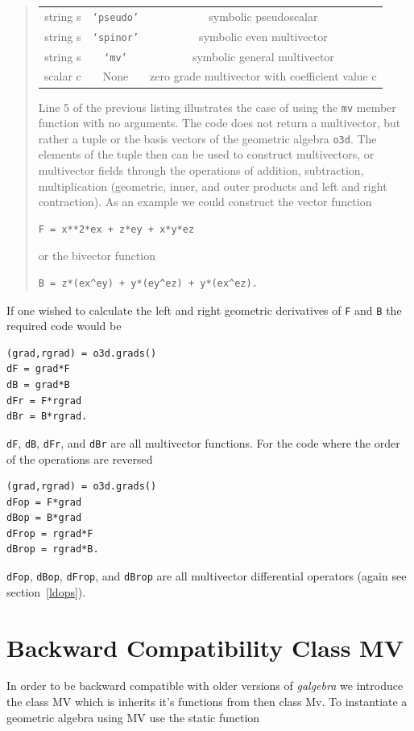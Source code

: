 \documentclass[12pt]{report}
\newcommand{\T}[1]{\texttt{#1}}
\begin{document}
\begin{quote}
\begin{center}
\begin{longtable}{ccc}
         string s &  \T{`pseudo'} & symbolic pseudoscalar \\
         string s &  \T{`spinor'} & symbolic even multivector \\ 
         string s &  \T{`mv'} & symbolic general multivector \\
         scalar c & None  &  zero grade multivector with coefficient value c 
	\end{longtable}
\end{center}
Line 5 of the previous listing illustrates the case of using the \T{mv} member function with
no arguments. The code does not return a multivector, but rather a tuple or the basis vectors of the geometric algebra \T{o3d}.  
The elements of the tuple then can
be used to construct multivectors, or multivector fields through the operations
of addition, subtraction, multiplication (geometric, inner, and outer products and left and right contraction).
As an example we could construct the vector function
\begin{lstlisting}[numbers=none]
F = x**2*ex + z*ey + x*y*ez
\end{lstlisting}	
or the bivector function
\begin{lstlisting}[numbers=none]
B = z*(ex^ey) + y*(ey^ez) + y*(ex^ez).
\end{lstlisting}	
\end{quote}
If one wished to calculate the left and right geometric derivatives of \T{F} and \T{B} the required code would be
\begin{lstlisting}
(grad,rgrad) = o3d.grads()
dF = grad*F
dB = grad*B
dFr = F*rgrad
dBr = B*rgrad.
\end{lstlisting}
\T{dF}, \T{dB}, \T{dFr}, and \T{dBr} are all multivector functions. For the code where the order of the operations are
reversed
\begin{lstlisting}
(grad,rgrad) = o3d.grads()
dFop = F*grad
dBop = B*grad
dFrop = rgrad*F
dBrop = rgrad*B.
\end{lstlisting}
\T{dFop}, \T{dBop}, \T{dFrop}, and \T{dBrop} are all multivector differential operators (again see section~\ref{ldops}).

\section{Backward Compatibility Class MV}

In order to be backward compatible with older versions of \emph{galgebra} we introduce the class MV which is inherits it's functions from
then class Mv. To instantiate a geometric algebra using MV use the static function
\end{document}
